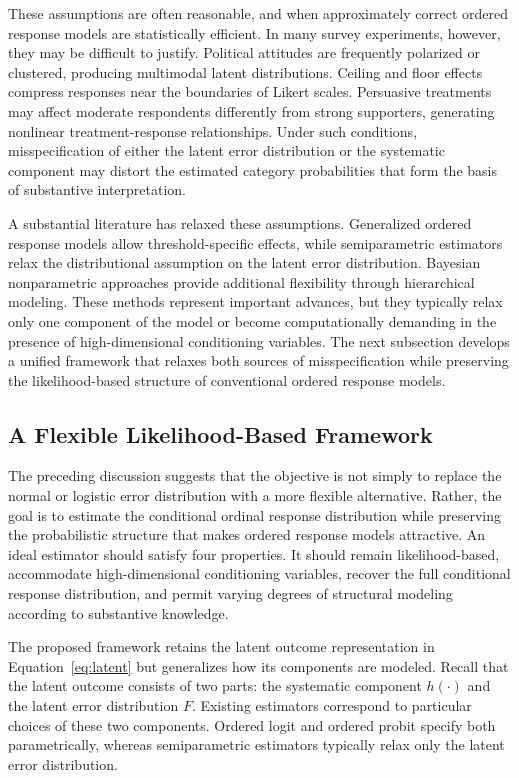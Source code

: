 \documentclass{article}
\begin{document}
These assumptions are often reasonable, and when approximately correct ordered response models are statistically efficient. In many survey experiments, however, they may be difficult to justify. Political attitudes are frequently polarized or clustered, producing multimodal latent distributions. Ceiling and floor effects compress responses near the boundaries of Likert scales. Persuasive treatments may affect moderate respondents differently from strong supporters, generating nonlinear treatment-response relationships. Under such conditions, misspecification of either the latent error distribution or the systematic component may distort the estimated category probabilities that form the basis of substantive interpretation.

A substantial literature has relaxed these assumptions. Generalized ordered response models allow threshold-specific effects, while semiparametric estimators relax the distributional assumption on the latent error distribution. Bayesian nonparametric approaches provide additional flexibility through hierarchical modeling. These methods represent important advances, but they typically relax only one component of the model or become computationally demanding in the presence of high-dimensional conditioning variables. The next subsection develops a unified framework that relaxes both sources of misspecification while preserving the likelihood-based structure of conventional ordered response models.

\subsection{A Flexible Likelihood-Based Framework}
\label{subsec:framework}

The preceding discussion suggests that the objective is not simply to replace the normal or logistic error distribution with a more flexible alternative. Rather, the goal is to estimate the conditional ordinal response distribution while preserving the probabilistic structure that makes ordered response models attractive. An ideal estimator should satisfy four properties. It should remain likelihood-based, accommodate high-dimensional conditioning variables, recover the full conditional response distribution, and permit varying degrees of structural modeling according to substantive knowledge.

The proposed framework retains the latent outcome representation in Equation~\eqref{eq:latent} but generalizes how its components are modeled. Recall that the latent outcome consists of two parts: the systematic component $h(\cdot)$ and the latent error distribution $F$. Existing estimators correspond to particular choices of these two components. Ordered logit and ordered probit specify both parametrically, whereas semiparametric estimators typically relax only the latent error distribution.
\end{document}
